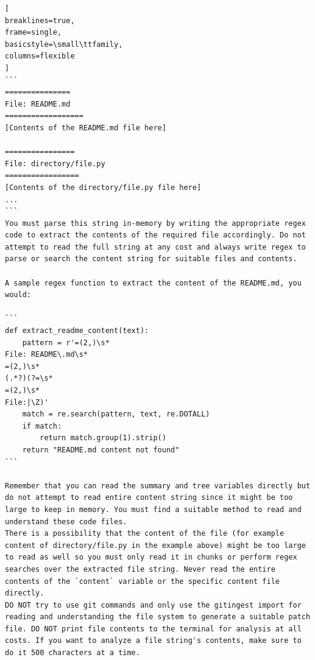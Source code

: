 \documentclass[11pt]{article}
\begin{document}
\begin{lstlisting}[  
breaklines=true,
frame=single,
basicstyle=\small\ttfamily,
columns=flexible
]
```
===============
File: README.md
==================
[Contents of the README.md file here]

================
File: directory/file.py
=================
[Contents of the directory/file.py file here]
...
```
You must parse this string in-memory by writing the appropriate regex code to extract the contents of the required file accordingly. Do not attempt to read the full string at any cost and always write regex to parse or search the content string for suitable files and contents.

A sample regex function to extract the content of the README.md, you would:

```
def extract_readme_content(text):
    pattern = r'=(2,)\s*
File: README\.md\s*
=(2,)\s*
(.*?)(?=\s*
=(2,)\s*
File:|\Z)'
    match = re.search(pattern, text, re.DOTALL)    
    if match:
        return match.group(1).strip()
    return "README.md content not found"
```

Remember that you can read the summary and tree variables directly but do not attempt to read entire content string since it might be too large to keep in memory. You must find a suitable method to read and understand these code files.
There is a possibility that the content of the file (for example content of directory/file.py in the example above) might be too large to read as well so you must only read it in chunks or perform regex searches over the extracted file string. Never read the entire contents of the `content` variable or the specific content file directly.
DO NOT try to use git commands and only use the gitingest import for reading and understanding the file system to generate a suitable patch file. DO NOT print file contents to the terminal for analysis at all costs. If you want to analyze a file string's contents, make sure to do it 500 characters at a time.
\end{lstlisting}
\end{document}

